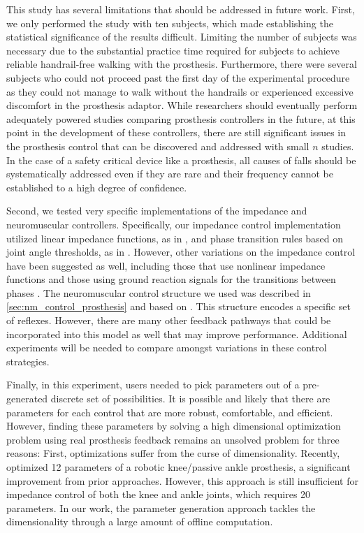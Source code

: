This study has several limitations that should be addressed in future work.
First, we only performed the study with ten subjects, which made establishing
the statistical significance of the results difficult. Limiting the number of
subjects was necessary due to the substantial practice time required for
subjects to achieve reliable handrail-free walking with the prosthesis.
Furthermore, there were several  subjects who could not proceed
past the first day of the experimental procedure as they could not manage to
walk without the handrails or experienced excessive discomfort in the prosthesis
adaptor. While researchers should eventually perform adequately powered studies
comparing prosthesis controllers in the future, at this point in the development
of these controllers, there are still significant issues in the prosthesis
control that can be discovered and addressed with small $n$ studies. In the case
of a safety critical device like a prosthesis, all causes of falls should be
systematically addressed even if they are rare and their frequency cannot be
established to a high degree of confidence.

Second, we tested very specific implementations of the impedance and
neuromuscular controllers. Specifically, our impedance control implementation
utilized linear impedance functions, as in \citet{sup2009preliminary}, and phase
transition rules based on joint angle thresholds, as in
\citet{lawson2014robotic}. However, other variations on the impedance control
have been suggested as well, including those that use nonlinear impedance
functions \citep{sup2007design,shultz2016variable} and those using ground
reaction signals for the transitions between phases \citep{sup2009preliminary}.
The neuromuscular control structure we used was described in
\cref{sec:nm_control_prosthesis} and based on \citet{song2015neural}. This
structure encodes a specific set of reflexes. However, there are many other
feedback pathways that could be incorporated into this model as well that may
improve performance. Additional experiments will be needed to compare amongst
variations in these control strategies.

Finally, in this experiment, users needed to pick parameters out of a
pre-generated discrete set of possibilities. It is possible and likely that
there are parameters for each control that are more robust, comfortable, and
efficient. However, finding these parameters by solving a high dimensional
optimization problem using real prosthesis feedback remains an unsolved problem
for three reasons: First, optimizations suffer from the curse of dimensionality.
Recently, \citet{wen2019online} optimized 12 parameters of a robotic
knee/passive ankle prosthesis, a significant improvement from prior approaches.
However, this approach is still insufficient for impedance control of both the
knee and ankle joints, which requires 20 parameters. In our work, the parameter
generation approach tackles the dimensionality through a large amount of offline
computation.

